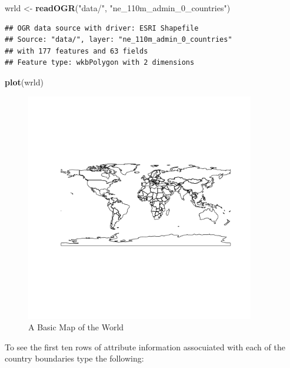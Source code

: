 \documentclass[]{article}
\newenvironment{Shaded}{}{}
\newcommand{\KeywordTok}[1]{\textcolor[rgb]{0.00,0.44,0.13}{\textbf{{#1}}}}
\newcommand{\StringTok}[1]{\textcolor[rgb]{0.25,0.44,0.63}{{#1}}}
\newcommand{\NormalTok}[1]{{#1}}
\let\Oldincludegraphics\includegraphics
\renewcommand{\includegraphics}[1]{\Oldincludegraphics[width=10cm]{#1}}
\begin{document}
\begin{Shaded}
\begin{Highlighting}[]
\NormalTok{wrld <- }\KeywordTok{readOGR}\NormalTok{(}\StringTok{"data/"}\NormalTok{, }\StringTok{"ne_110m_admin_0_countries"}\NormalTok{)}
\end{Highlighting}
\end{Shaded}
\begin{verbatim}
## OGR data source with driver: ESRI Shapefile 
## Source: "data/", layer: "ne_110m_admin_0_countries"
## with 177 features and 63 fields
## Feature type: wkbPolygon with 2 dimensions
\end{verbatim}
\begin{Shaded}
\begin{Highlighting}[]
\KeywordTok{plot}\NormalTok{(wrld)}
\end{Highlighting}
\end{Shaded}
\begin{figure}[htbp]
\centering
\includegraphics{figure/A_Basic_Map_of_the_World.png}
\caption{A Basic Map of the World}
\end{figure}

To see the first ten rows of attribute information assocuiated with each
of the country boundaries type the following:
\end{document}
